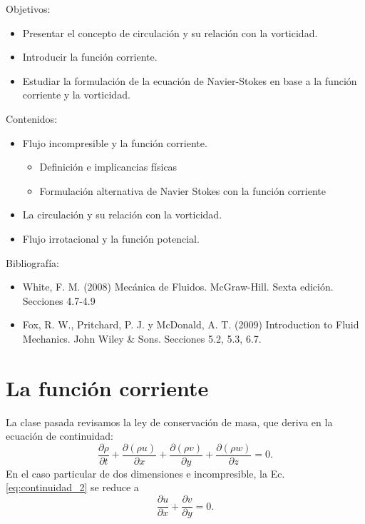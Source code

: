 \begin{framed}

Objetivos:
\begin{itemize}
    \item Presentar el concepto de circulación y su relación con la vorticidad.
    \item Introducir la función corriente.
    \item Estudiar la formulación de la ecuación de Navier-Stokes en base a la función corriente y la vorticidad.
\end{itemize}

Contenidos:
\begin{itemize}
    \item Flujo incompresible y la función corriente.
    \begin{itemize}
        \item Definición e implicancias físicas
        \item Formulación alternativa de Navier Stokes con la función corriente
    \end{itemize}
    \item La circulación y su relación con la vorticidad.
    \item Flujo irrotacional y la función potencial.
\end{itemize}

Bibliografía:
\begin{itemize}
    \item White, F. M. (2008) Mecánica de Fluidos. McGraw-Hill. Sexta edición. Secciones 4.7-4.9
    \item Fox, R. W., Pritchard, P. J. y McDonald, A. T. (2009) Introduction to Fluid Mechanics. John Wiley \& Sons. Secciones 5.2, 5.3, 6.7.
\end{itemize}
\end{framed}

\section*{La función corriente}

La clase pasada revisamos la ley de conservación de masa, que deriva en la ecuación de continuidad:
%
\begin{equation} \label{eq:continuidad_2}
\frac{\partial \rho}{\partial t} + \frac{\partial(\rho u)}{\partial x} + \frac{\partial(\rho v)}{\partial y} + \frac{\partial(\rho w)}{\partial z} = 0.
\end{equation}
%
En el caso particular de dos dimensiones e incompresible, la Ec. \eqref{eq:continuidad_2} se reduce a
%
\begin{equation} \label{eq:continuidad2D}
\frac{\partial u}{\partial x} + \frac{\partial v}{\partial y} = 0.
\end{equation}

